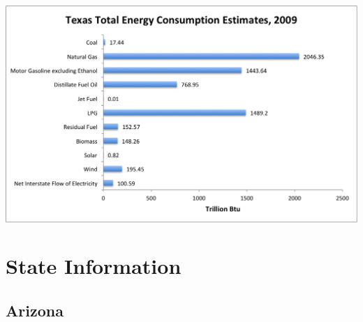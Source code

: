 \documentclass[9pt,twocolumn,twoside]{pnas-new}
\begin{document}
\begin{center}
\includegraphics[width=15cm]{TexasQuickGraph.png}
\end{center}

\section*{State Information}


\subsection*{Arizona}
\end{document}

